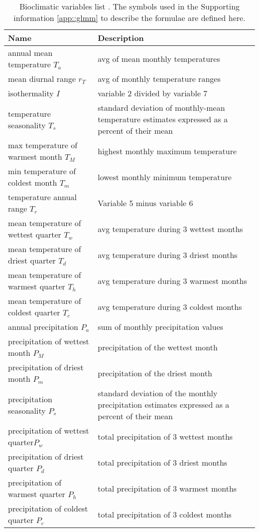 \begin{refsection}
\begin{table}[h!]
\centering
\caption{Bioclimatic variables list \citep{McKenney2011}. The symbols used in the Supporting information \ref{app::glmm} to describe the formulae are defined here. \label{tab::bioclim}}
\begin{tabular}{p{6.75cm}p{9cm}}
	\toprule
	\textbf{Name} & \textbf{Description} \\
	\midrule
	annual mean temperature $ T_a $ & avg of mean monthly temperatures \\
	mean diurnal range $ r_T $ & avg of monthly temperature ranges \\
	isothermality $ I $ & variable 2 divided by variable 7 \\
	temperature seasonality $ T_s $ & standard deviation of monthly-mean temperature estimates expressed as a percent of their mean \\
	max temperature of warmest month $ T_M $ & highest monthly maximum temperature \\
	min temperature of coldest month $ T_m $ & lowest monthly minimum temperature \\
	temperature annual range $ T_r $ & Variable 5 minus variable 6 \\
	mean temperature of wettest quarter $ T_w $ & avg temperature during 3 wettest months \\
	mean temperature of driest quarter $ T_d $ & avg temperature during 3 driest months \\
	mean temperature of warmest quarter $ T_h $ & avg temperature during 3 warmest months \\
	mean temperature of coldest quarter $ T_c $ & avg temperature during 3 coldest months \\
	annual precipitation $ P_a $ & sum of monthly precipitation values \\
	precipitation of wettest month $ P_M $ & precipitation of the wettest month \\
	precipitation of driest month $ P_m $ & precipitation of the driest month \\
	precipitation seasonality $ P_s $ & standard deviation of the monthly precipitation estimates expressed as a percent of their mean \\
	precipitation of wettest quarter$ P_w $  & total precipitation of 3 wettest months \\
	precipitation of driest quarter $ P_d $ & total precipitation of 3 driest months \\
	precipitation of warmest quarter $ P_h $ & total precipitation of 3 warmest months \\
	precipitation of coldest quarter $ P_c $ & total precipitation of 3 coldest months \\
	\bottomrule
\end{tabular}
\end{table}


\end{refsection}
